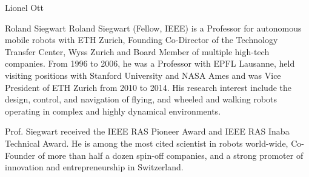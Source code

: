 \documentclass[journal]{IEEEtran}  %
\begin{document}
\begin{IEEEbiography}{Lionel Ott}
\end{IEEEbiography}

\begin{IEEEbiography}{Roland Siegwart}
Roland Siegwart (Fellow, IEEE) is a Professor for autonomous mobile robots with ETH Zurich, Founding Co-Director of the Technology Transfer Center, Wyss Zurich and Board Member of multiple high-tech companies. From 1996 to 2006, he was a Professor with EPFL Lausanne, held visiting positions with Stanford University and NASA Ames and was Vice President of ETH Zurich from 2010 to 2014. His research interest include the design, control, and navigation of flying, and wheeled and walking robots operating in complex and highly dynamical environments.

Prof. Siegwart received the IEEE RAS Pioneer Award and IEEE RAS Inaba Technical Award. He is among the most cited scientist in robots world-wide, Co-Founder of more than half a dozen spin-off companies, and a strong promoter of innovation and entrepreneurship in Switzerland.
\end{IEEEbiography}
\vfill
\end{document}
